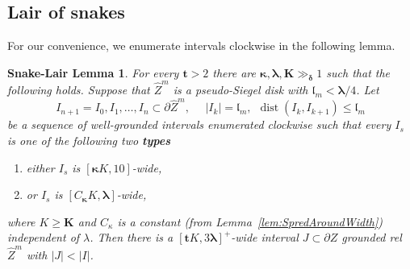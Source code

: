 \documentclass{amsart}
\renewcommand{\sp}{{\ \ }}
\newcommand{\1}{{\mathbb 1 }}
\newcommand{\blambda}{{\boldsymbol\lambda}}
\newcommand{\bkappa}{{\boldsymbol\kappa}}
\newcommand{\wZ}{{\widehat Z}}
\newcommand{\bK}{{\mathbf K}}
\newcommand{\bbt}{{\mathbf t}}
\newcommand{\length}{{\mathfrak l}}
\newtheorem{lairlmm}[thm]{Snake-Lair Lemma}
\theoremstyle{remark}
\numberwithin{equation}{section}
\theoremstyle{definition}
\newcommand{\dist}{\operatorname{dist}}
\newcommand{\bdelta}{{\boldsymbol{ \delta}}}
\begin{document}
\subsection{Lair of snakes}
For our convenience, we enumerate intervals clockwise in the following lemma.
\begin{lairlmm}
\label{lem:Hive Lemma}
For every $\bbt>2$ there are $\bkappa,\blambda,\bK\gg_{\bdelta}1$ such that the following holds. Suppose that $\wZ^m$ is a pseudo-Siegel disk with $\length_m< \blambda/4$. Let \[I_{n+1}=I_0, I_1,\dots , I_n\subset \partial \wZ^m, \sp\sp\sp |I_k| = \length_m,\sp  \dist(I_k, I_{k+1})\le \length_m\]
be a sequence of well-grounded intervals enumerated clockwise such that every $I_s$ is one of the following two {\bf types}
\begin{enumerate}
\item either $I_s$ is $[\bkappa K,10]$-wide, \label{case:I_k:1}
\item or $I_s$ is $[ C_{\bkappa} K,\blambda]$-wide,\label{case:I_k:2}
\end{enumerate} 
where $K\ge \bK$ and $C_\kappa$ is a constant (from Lemma~\ref{lem:SpredAroundWidth}) independent of $\lambda$. Then there is a $[\bbt K,3 \blambda]^+$-wide interval $J\subset \partial Z$ grounded rel $\wZ^m$ with $|J|<|I|$.
\end{lairlmm}
\end{document}
